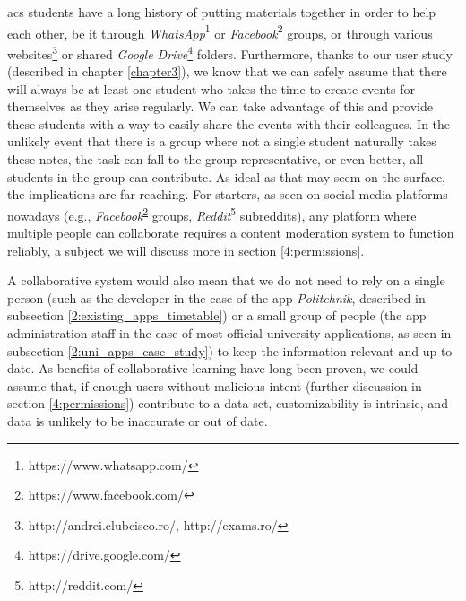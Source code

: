     \acrshort{acs} students have a long history of putting materials together in order to help each other, be it through \textit{WhatsApp}\footnote{https://www.whatsapp.com/} or \textit{Facebook}\footnote{\label{2:note:facebook}https://www.facebook.com/} groups, or through various websites\footnote{http://andrei.clubcisco.ro/, http://exams.ro/} or shared \textit{Google Drive}\footnote{https://drive.google.com/} folders. Furthermore, thanks to our user study (described in chapter \ref{chapter3}), we know that we can safely assume that there will always be at least one student who takes the time to create events for themselves as they arise regularly. We can take advantage of this and provide these students with a way to easily share the events with their colleagues. In the unlikely event that there is a group where not a single student naturally takes these notes, the task can fall to the group representative, or even better, all students in the group can contribute. As ideal as that may seem on the surface, the implications are far-reaching. For starters, as seen on social media platforms nowadays (e.g., \textit{Facebook}\textsuperscript{\ref{2:note:facebook}} groups, \textit{Reddit}\footnote{http://reddit.com/} subreddits), any platform where multiple people can collaborate requires a content moderation system\cite{roberts2019behind} to function reliably, a subject we will discuss more in section \ref{4:permissions}.
    
    A collaborative system would also mean that we do not need to rely on a single person (such as the developer in the case of the app \textit{Politehnik}, described in subsection \ref{2:existing_apps_timetable}) or a small group of people (the app administration staff in the case of most official university applications, as seen in subsection \ref{2:uni_apps_case_study}) to keep the information relevant and up to date. As benefits of collaborative learning have long been proven\cite{klemm1997benefits}, we could assume that, if enough users without malicious intent (further discussion in section \ref{4:permissions}) contribute to a data set, customizability is intrinsic, and data is unlikely to be inaccurate or out of date.